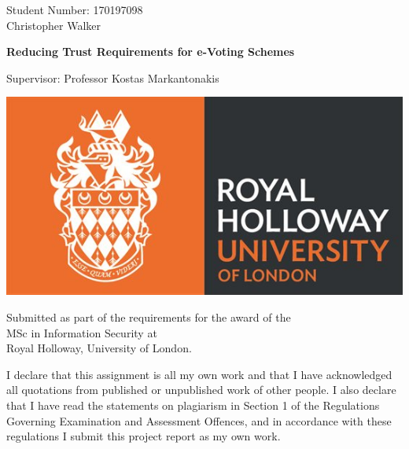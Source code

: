 
\begin{titlepage}



    \begin{center}
        {\large Student Number: 170197098 \\ Christopher Walker}

        \vspace*{1em}

        {\Huge\bfseries Reducing Trust Requirements for e-Voting Schemes}

        \vspace*{1em}

        {\large Supervisor:  Professor Kostas Markantonakis}

        \vspace*{1em}

        \includegraphics[scale=0.5]{lib/rhuol_logo.jpg}

        \vspace*{2em}

        \large Submitted as part of the requirements for the award of the \\
    MSc in Information Security at \\
    Royal Holloway, University of London.

    \end{center}

    \vspace*{\fill}

    \begin{flushleft}
    I declare that this assignment is all my own work and that I have acknowledged all quotations from published or unpublished work of other people.  I also declare that I have read the statements on plagiarism in Section 1 of the Regulations Governing Examination and Assessment Offences, and in accordance with these regulations I submit this project report as my own work.


\end{flushleft}
\end{titlepage}
